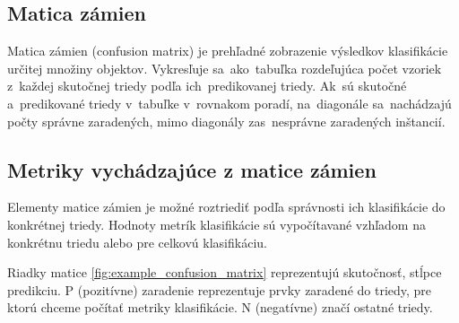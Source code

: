         \subsection{Matica zámien}
            Matica zámien (confusion matrix) je prehľadné zobrazenie výsledkov klasifikácie určitej množiny objektov. Vykresľuje sa~ako~tabuľka rozdeľujúca počet vzoriek z~každej skutočnej triedy podľa ich~predikovanej triedy. Ak~sú skutočné a~predikované triedy v~tabuľke v~rovnakom poradí, na~diagonále sa~nachádzajú počty správne zaradených, mimo diagonály zas~nesprávne zaradených inštancií.

        \subsection{Metriky vychádzajúce z matice zámien}
            Elementy matice zámien je možné roztriediť podľa správnosti ich klasifikácie do konkrétnej triedy. Hodnoty metrík klasifikácie sú vypočítavané vzhľadom na konkrétnu triedu alebo pre celkovú klasifikáciu.

            Riadky matice \ref{fig:example_confusion_matrix} reprezentujú skutočnosť, stĺpce predikciu. P (pozitívne) zaradenie reprezentuje prvky zaradené do triedy, pre ktorú chceme počítať metriky klasifikácie. N (negatívne) značí ostatné triedy.

